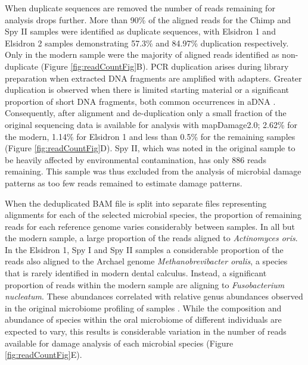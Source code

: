 \documentclass[12pt, a4paper]{article}
\begin{document}
When duplicate sequences are removed the number of reads remaining for analysis drops further. 
More than 90\% of the aligned reads for the Chimp and Spy II samples were identified as duplicate sequences, with Elsidron 1 and Elsidron 2 samples demonstrating 57.3\% and 84.97\% duplication respectively. 
Only in the modern sample were the majority of aligned reads identified as non-duplicate (Figure \ref{fig:readCountFig}B). 
PCR duplication arises during library preparation when extracted DNA fragments are amplified with adapters.
Greater duplication is observed when there is limited starting material or a significant proportion of short DNA fragments, both common occurrences in aDNA \cite{Kircher:2012aa}.
Consequently, after alignment and de-duplication only a small fraction of the original sequencing data is available for analysis with mapDamage2.0; 2.62\% for the modern, 1.14\% for Elsidron 1 and less than 0.5\% for the remaining samples (Figure \ref{fig:readCountFig}D).
Spy II, which was noted in the original sample to be heavily affected by environmental contamination, has only 886 reads remaining.  
This sample was thus excluded from the analysis of microbial damage patterns as too few reads remained to estimate damage patterns.

When the deduplicated BAM file is split into separate files representing alignments for each of the selected microbial species, the proportion of remaining reads for each reference genome varies considerably between samples. 
In all but the modern sample, a large proportion of the reads aligned to \textit{Actinomyces oris}. 
In the Elsidron 1, Spy I and Spy II samples a considerable proportion of the reads also aligned to the Archael genome \textit{Methanobrevibacter oralis}, a species that is rarely identified in modern dental calculus. 
Instead, a significant proportion of reads within the modern sample are aligning to \textit{Fusobacterium nucleatum}. 
These abundances correlated with relative genus abundances observed in the original microbiome profiling of samples \cite{Weyrich:2017aa}.
While the composition and abundance of species within the oral microbiome of different individuals are expected to vary, this results is considerable variation in the number of reads available for damage analysis of each microbial species (Figure \ref{fig:readCountFig}E).
\end{document}
